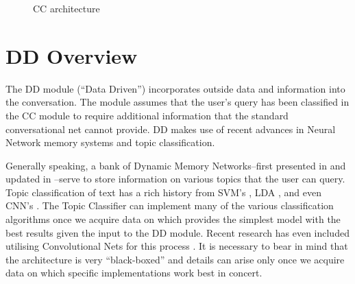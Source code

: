 \documentclass[10pt,twoside,twocolumn]{article}
\begin{document}
\begin{figure}[H]
    \centering
    
    \label{DD_design}
    \caption{CC architecture}
\end{figure}

\section{DD Overview}
The DD module (``Data Driven'') incorporates outside data and information into the conversation. The module assumes that the user's query has been classified in the CC module to require additional information that the standard conversational net cannot provide. DD makes use of recent advances in Neural Network memory systems and topic classification.

\noindent
Generally speaking, a bank of Dynamic Memory Networks--first presented in \cite{Kumar:2015} and updated in \cite{Xiong2016}--serve to store information on various topics that the user can query. Topic classification of text has a rich history from SVM's \cite{Joachims1998, Pilaszy2005}, LDA \cite{Blei2001, Zhao2011}, and even CNN's \cite{Kim2014}. The Topic Classifier can implement many of the various classification algorithms once we acquire data on which provides the simplest model with the best results given the input to the DD module. Recent research has even included utilising Convolutional Nets for this process \cite{Kim2014}. It is necessary to bear in mind that the architecture is very ``black-boxed'' and details can arise only once we acquire data on which specific implementations work best in concert.
\end{document}
